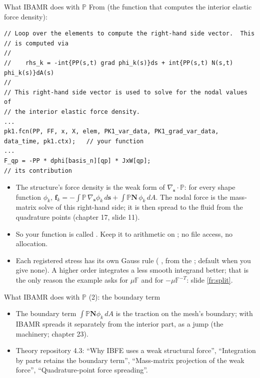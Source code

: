 \documentclass[aspectratio=169,11pt]{beamer}
\begin{document}
\begin{frame}[fragile]{What IBAMR does with $\mathbb{P}$}
\label{fr:weakform}
\footnotesize
From  (the function that computes the interior elastic force density):
\begin{lstlisting}[style=cpptiny]
// Loop over the elements to compute the right-hand side vector.  This
// is computed via
//
//    rhs_k = -int{PP(s,t) grad phi_k(s)}ds + int{PP(s,t) N(s,t) phi_k(s)}dA(s)
//
// This right-hand side vector is used to solve for the nodal values of
// the interior elastic force density.
...
pk1.fcn(PP, FF, x, X, elem, PK1_var_data, PK1_grad_var_data, data_time, pk1.ctx);   // your function
...
F_qp = -PP * dphi[basis_n][qp] * JxW[qp];                                         // its contribution
\end{lstlisting}
\begin{itemize}
  \item The structure's force density is the weak form of $\nabla_{\mathbf{s}}\cdot\mathbb{P}$: for every shape function $\phi_k$, $\mathbf{f}_k = -\int \mathbb{P}\,\nabla_{\mathbf{s}}\phi_k\,d\mathbf{s} + \int \mathbb{P}\mathbf{N}\,\phi_k\,dA$. The nodal force is the mass-matrix solve of this right-hand side; it is then spread to the fluid from the quadrature points (chapter 17, slide 11).
  \item So your function is called . Keep it to arithmetic on ; no file access, no allocation.
  \item Each registered stress has its own Gauss rule ( ,  from the ; default  when you give none). A higher order integrates a less smooth integrand better; that is the only reason the example asks  for $\mu\mathbb{F}$ and  for $-\mu\mathbb{F}^{-T}$: slide \ref{fr:split}.
\end{itemize}
\end{frame}

\begin{frame}{What IBAMR does with $\mathbb{P}$ (2): the boundary term}
\label{fr:weakform2}
\footnotesize
\begin{itemize}
  \item The boundary term $\int \mathbb{P}\mathbf{N}\phi_k\,dA$ is the traction on the mesh's boundary; with  IBAMR spreads it separately from the interior part, as a jump (the  machinery; chapter 23).
  \item Theory repository 4.3: ``Why IBFE uses a weak structural force'', ``Integration by parts retains the boundary term'', ``Mass-matrix projection of the weak force'', ``Quadrature-point force spreading''.
\end{itemize}
\end{frame}
\end{document}
